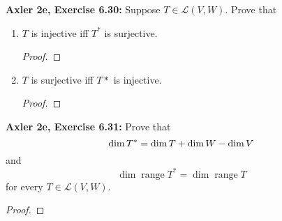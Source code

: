 \documentclass{article}
\DeclareMathOperator{\range}{range}
\begin{document}
\newpage %


\textbf{Axler 2e, Exercise 6.30: }
Suppose $T \in \mathcal{L}(V, W)$. Prove that

\begin{enumerate}
    \item 
    $T$ is injective iff $T^*$ is surjective.
    \begin{proof}
        
    \end{proof}


    \item 
    $T$ is surjective iff $T*$ is injective.
    \begin{proof}
        
    \end{proof}
\end{enumerate}


\newpage %


\textbf{Axler 2e, Exercise 6.31: }
Prove that
$$\dim \null T^* = \dim \null T + \dim W - \dim V$$
and
$$\dim \range T^* = \dim \range T$$
for every $T \in \mathcal{L}(V, W)$.
\begin{proof}
    
\end{proof}
\end{document}
